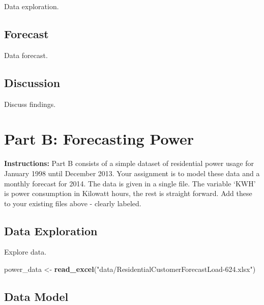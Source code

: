 \documentclass[openany]{book}
\newenvironment{Shaded}{\begin{snugshade}}{\end{snugshade}}
\newcommand{\KeywordTok}[1]{\textcolor[rgb]{0.13,0.29,0.53}{\textbf{#1}}}
\newcommand{\NormalTok}[1]{#1}
\newcommand{\StringTok}[1]{\textcolor[rgb]{0.31,0.60,0.02}{#1}}
\renewenvironment{quote}{\begin{myquote}}{\end{myquote}}
\begin{document}
Data exploration.

\hypertarget{a-forecast}{%
\section*{Forecast}\label{a-forecast}}

Data forecast.

\hypertarget{a-discussion}{%
\section*{Discussion}\label{a-discussion}}

Discuss findings.

\hypertarget{part-b}{%
\chapter*{Part B: Forecasting Power}\label{part-b}}

\begin{quote}
\textbf{Instructions:} Part B consists of a simple dataset of residential power usage for January 1998 until December 2013. Your assignment is to model these data and a monthly forecast for 2014. The data is given in a single file. The variable `KWH' is power consumption in Kilowatt hours, the rest is straight forward. Add these to your existing files above - clearly labeled.
\end{quote}

\hypertarget{b-exploration}{%
\section*{Data Exploration}\label{b-exploration}}

Explore data.

\begin{Shaded}
\begin{Highlighting}[]
\NormalTok{power_data <-}\StringTok{ }\KeywordTok{read_excel}\NormalTok{(}\StringTok{"data/ResidentialCustomerForecastLoad-624.xlsx"}\NormalTok{) }
\end{Highlighting}
\end{Shaded}

\hypertarget{b-model}{%
\section*{Data Model}\label{b-model}}
\end{document}
